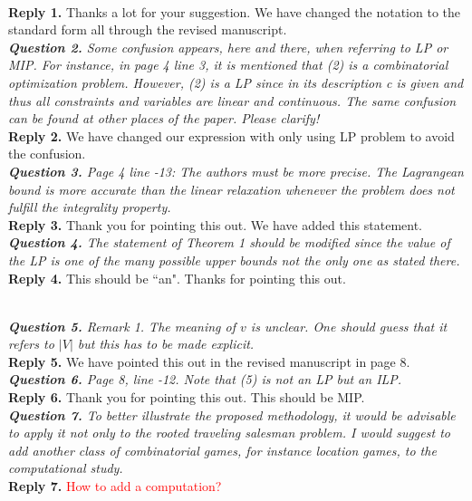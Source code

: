 \documentclass[11pt]{article}
\begin{document}
\\[2mm]
\noindent \textbf{Reply 1.}
Thanks a lot for your suggestion.
We have changed the notation to the standard form all through the revised manuscript.
\\[4mm]
%
%
%
\noindent \textit{\textbf{Question 2.}
Some confusion appears, here and there, when referring to LP or MIP.
For instance, in page 4 line 3, it is mentioned that (2) is a combinatorial optimization problem. However, (2) is a LP since in its description c is
given and thus all constraints and variables are linear and continuous.
The same confusion can be found at other places of the paper. Please clarify!}
\\[2mm]
\noindent \textbf{Reply 2.}
We have changed our expression with only using LP problem to avoid the confusion.
\\[4mm]
%
%
%
\noindent \textit{\textbf{Question 3.}
Page 4 line -13: The authors must be more precise. The Lagrangean
bound is more accurate than the linear relaxation whenever the problem does not fulfill the integrality property.
}
\\[2mm]
\noindent \textbf{Reply 3.}
Thank you for pointing this out.
We have added this statement.
\\[4mm]
%
%
%
\noindent \textit{\textbf{Question 4.}
The statement of Theorem 1 should be modified since the value of the
LP is one of the many possible upper bounds not the only one as stated
there.
}
\\[2mm]
\noinden \textbf{Reply 4.}
This should be ``an". Thanks for pointing this out.

\\[4mm]
%
%
%
\noindent \textit{\textbf{Question 5.}
Remark 1. The meaning of $v$ is unclear. One should guess that it refers
to $|V|$ but this has to be made explicit.
}
\\[2mm]
\noindent \textbf{Reply 5.}
We have pointed this out in the revised manuscript in page 8.
\\[4mm]
%
%
%
\noindent \textit{\textbf{Question 6.}
Page 8, line -12. Note that (5) is not an LP but an ILP.
}
\\[2mm]
\noindent \textbf{Reply 6.}
Thank you for pointing this out.
This should be MIP.
\\[4mm]
%
%
%
\noindent \textit{\textbf{Question 7.}
To better illustrate the proposed methodology, it would be advisable
to apply it not only to the rooted traveling salesman problem. I would
suggest to add another class of combinatorial games, for instance location games, to the computational study.}
\\[2mm]
\noindent \textbf{Reply 7.}
\textcolor{red}{How to add a computation?}
\\[4mm]
%
%

\end{document}
